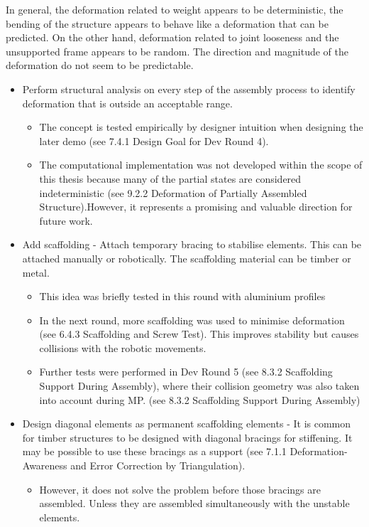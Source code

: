 In general, the deformation related to weight appears to be deterministic, the bending of the structure appears to behave like a deformation that can be predicted. On the other hand, deformation related to joint looseness and the unsupported frame appears to be random. The direction and magnitude of the deformation do not seem to be predictable.
\begin{itemize}
\item Perform structural analysis on every step of the assembly process to identify deformation that is outside an acceptable range.
\begin{itemize}
    \item The concept is tested empirically by designer intuition when designing the later demo (see 7.4.1 Design Goal for Dev Round 4).
    \item The computational implementation was not developed within the scope of this thesis because many of the partial states are considered indeterministic (see 9.2.2 Deformation of Partially Assembled Structure).However, it represents a promising and valuable direction for future work.
\end{itemize}
\item Add scaffolding - Attach temporary bracing to stabilise elements. This can be attached manually or robotically. The scaffolding material can be timber or metal. 
\begin{itemize}
    \item This idea was briefly tested in this round with aluminium profiles
    \item In the next round, more scaffolding was used to minimise deformation (see 6.4.3 Scaffolding and Screw Test). This improves stability but causes collisions with the robotic movements. 
    \item Further tests were performed in Dev Round 5 (see 8.3.2 Scaffolding Support During Assembly), where their collision geometry was also taken into account during MP. (see 8.3.2 Scaffolding Support During Assembly)
\end{itemize}
\item Design diagonal elements as permanent scaffolding elements - It is common for timber structures to be designed with diagonal bracings for stiffening. It may be possible to use these bracings as a support (see 7.1.1 Deformation-Awareness and Error Correction by Triangulation).
    \begin{itemize}
    \item However, it does not solve the problem before those bracings are assembled. Unless they are assembled simultaneously with the unstable elements.

\end{itemize}
\end{itemize}
